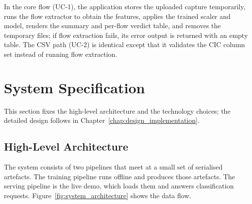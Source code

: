 \par In the core flow (UC-1), the application stores the uploaded capture temporarily, runs the flow extractor to obtain the features, applies the trained scaler and model, renders the summary and per-flow verdict table, and removes the temporary files; if flow extraction fails, its error output is returned with an empty table. The CSV path (UC-2) is identical except that it validates the CIC column set instead of running flow extraction.

\section{System Specification}
\label{sec:system_specification}

\par This section fixes the high-level architecture and the technology choices; the detailed design follows in Chapter~\ref{chap:design_implementation}.

\subsection{High-Level Architecture}
\label{subsec:high_level_architecture}

\par The system consists of two pipelines that meet at a small set of serialised artefacts. The training pipeline runs offline and produces those artefacts. The serving pipeline is the live demo, which loads them and answers classification requests. Figure~\ref{fig:system_architecture} shows the data flow.

